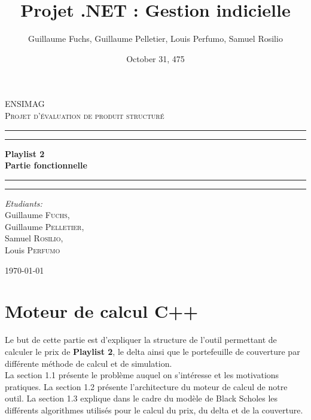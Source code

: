 \documentclass[french,12pt,a4paper]{article}
\title{Projet .NET : Gestion indicielle}
\date{October 31, 475}
\author{Guillaume Fuchs, Guillaume Pelletier, Louis Perfumo, Samuel Rosilio}
\begin{document}
\begin{titlepage}
\begin{center}

\textsc{\LARGE ENSIMAG}\\[1.5cm]

\textsc{\Large Projet d'évaluation de produit structuré}\\[0.5cm]

 \hrule
 \hrule 

\vspace{7mm}
{ \huge \bfseries Playlist 2\\ Partie fonctionnelle  }

\vspace{7mm}
\hrule
\hrule

\vspace{7mm}
\begin{minipage}{0.4\textwidth}
\begin{flushleft} \large
\emph{Etudiants:}\\
Guillaume \textsc{Fuchs},\\
Guillaume \textsc{Pelletier},\\
Samuel \textsc{Rosilio},\\
Louis \textsc{Perfumo}
\end{flushleft}
\end{minipage}

\vfill

{\large \today}

\end{center}
\end{titlepage}
\tableofcontents
\newpage

\section{Moteur de calcul C++}
Le but de cette partie est d'expliquer la structure de l'outil permettant de calculer le prix de \textbf{Playlist 2}, le delta ainsi que le portefeuille de couverture par différente méthode de calcul et de simulation.\\
La section 1.1 présente le problème auquel on s'intéresse et les motivations pratiques. La section 1.2 présente l'architecture du moteur de calcul de notre outil. La section 1.3 explique dans le cadre du modèle de Black Scholes les différents algorithmes utilisés pour le calcul du prix, du delta et de la couverture.
\end{document}
